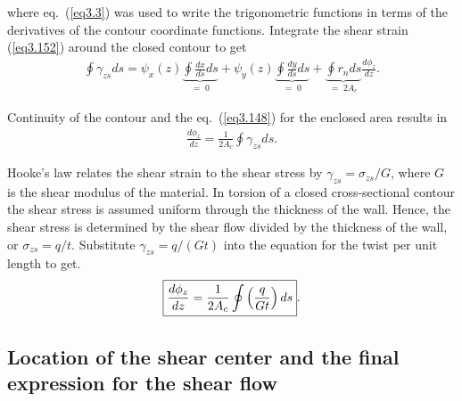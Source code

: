 \documentclass{AeroStructure-ERJohnson}
\begin{document}
\vspace*{-1pc}\pagebreak

\noindent where eq.~(\ref{eq3.3}) was used to write the trigonometric functions in terms of the derivatives of the contour coordinate functions. Integrate the shear strain (\ref{eq3.152}) around the closed contour to get\vspace*{-2pt}
\begin{align}\label{eq3.153}
\oint\!\gamma_{z s} d s=\psi_{x}(z) \underbrace{\oint{\frac{d x}{d s}} d s}_{=\;0}+\psi_{y}(z) \underbrace{\oint{\frac{d y}{d s} d s}}_{=\;0}
+\underbrace{\oint r_{n} d s}_{=\;2 A_{c}} \frac{d \phi_{z}}{d z}.
\end{align}

\vspace*{-14pt}

\noindent Continuity of the contour and the eq.~(\ref{eq3.148}) for the enclosed area results in\vspace*{-2pt}
\begin{align*}
\frac{d \phi_{z}}{d z}=\frac{1}{2 A_{c}} \oint \gamma_{z s} d s.
\end{align*}

\vspace*{-14pt}

\noindent Hooke's law relates the shear strain to the shear stress by $\gamma_{z s}=\sigma_{z s} / G$, where $G$ is the shear modulus of the material. In torsion of a closed cross-sectional contour the shear stress is assumed uniform through the thickness of the wall. Hence, the shear stress is determined by the shear flow divided by the thickness of the wall, or $\sigma_{z s}=q / t$. Substitute $\gamma_{z s}=q /(G t)$ into the equation for the twist per unit length to get.
\begin{align}\label{eq3.154}
\fbox{$\displaystyle\frac{d \phi_{z}}{d z}=\frac{1}{2 A_{c}} \oint\left(\frac{q}{G t}\right) d s$}.
\end{align}

\subsection{Location of the shear center and the final expression for the shear flow}\label{sec3.11.2}
\end{document}

